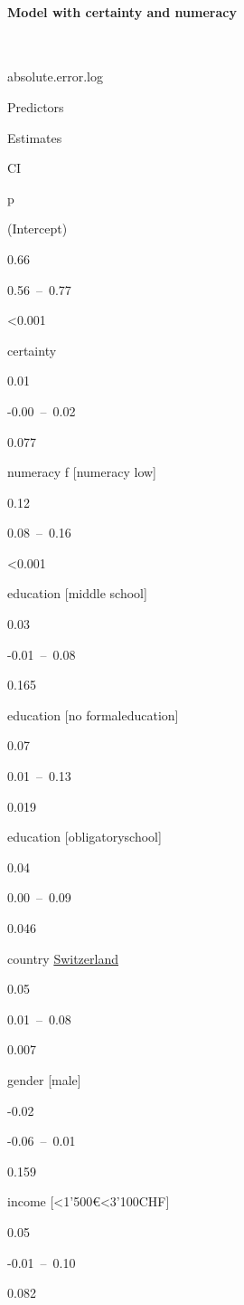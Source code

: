 \documentclass[
]{article}
\begin{document}
\hypertarget{model-with-certainty-and-numeracy}{%
\paragraph{Model with certainty and
numeracy}\label{model-with-certainty-and-numeracy}}

~

absolute.error.log

Predictors

Estimates

CI

p

(Intercept)

0.66

0.56~--~0.77

\textless0.001

certainty

0.01

-0.00~--~0.02

0.077

numeracy f {[}numeracy low{]}

0.12

0.08~--~0.16

\textless0.001

education {[}middle school{]}

0.03

-0.01~--~0.08

0.165

education {[}no formaleducation{]}

0.07

0.01~--~0.13

0.019

education {[}obligatoryschool{]}

0.04

0.00~--~0.09

0.046

country \protect\hyperlink{switzerland}{Switzerland}

0.05

0.01~--~0.08

0.007

gender {[}male{]}

-0.02

-0.06~--~0.01

0.159

income {[}\textless1'500€\textless3'100CHF{]}

0.05

-0.01~--~0.10

0.082
\end{document}
